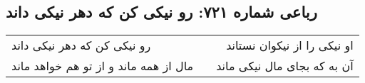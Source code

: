 \begin{center}
\section*{رباعی شماره ۷۲۱: رو نیکی کن که دهر نیکی داند}
\label{sec:0721}
\begin{longtable}{l p{0.5cm} r}
رو نیکی کن که دهر نیکی داند
&&
او نیکی را از نیکوان نستاند
\\
مال از همه ماند و از تو هم خواهد ماند
&&
آن به که بجای مال نیکی ماند
\\
\end{longtable}
\end{center}
